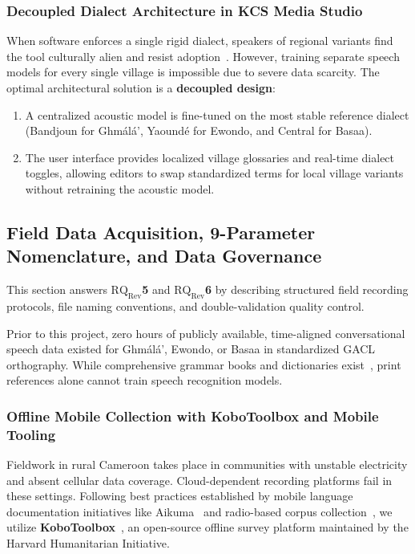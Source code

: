\documentclass[a4paper,11pt]{article}
\begin{document}
\subsubsection{Decoupled Dialect Architecture in KCS Media Studio}
\label{sec:chap2_dialect_handling}
When software enforces a single rigid dialect, speakers of regional variants find the tool culturally alien and resist adoption~\cite{bitjaakody2001basaa}. However, training separate speech models for every single village is impossible due to severe data scarcity. The optimal architectural solution is a \textbf{decoupled design}:
\begin{enumerate}
    \item A centralized acoustic model is fine-tuned on the most stable reference dialect (Bandjoun for Gh\textopeno m\'al\'a', Yaound\'e for Ewondo, and Central for Basaa).
    \item The user interface provides localized village glossaries and real-time dialect toggles, allowing editors to swap standardized terms for local village variants without retraining the acoustic model.
\end{enumerate}

\subsection{Field Data Acquisition, 9-Parameter Nomenclature, and Data Governance}
\label{sec:chap2_corpus}

This section answers \textbf{$\text{RQ}_{\text{Rev}}$5} and \textbf{$\text{RQ}_{\text{Rev}}$6} by describing structured field recording protocols, file naming conventions, and double-validation quality control.

Prior to this project, zero hours of publicly available, time-aligned conversational speech data existed for Gh\textopeno m\'al\'a', Ewondo, or Basaa in standardized GACL orthography. While comprehensive grammar books and dictionaries exist~\cite{tadadjeu1979alphabet, essono2000ewondo, lemb1973dictionnaire}, print references alone cannot train speech recognition models.

\subsubsection{Offline Mobile Collection with KoboToolbox and Mobile Tooling}
\label{sec:chap2_kobo}
Fieldwork in rural Cameroon takes place in communities with unstable electricity and absent cellular data coverage. Cloud-dependent recording platforms fail in these settings. Following best practices established by mobile language documentation initiatives like Aikuma~\cite{bird2014aikuma} and radio-based corpus collection~\cite{doumbouya2021using}, we utilize \textbf{KoboToolbox}~\cite{kobotoolbox2024}, an open-source offline survey platform maintained by the Harvard Humanitarian Initiative.
\end{document}
